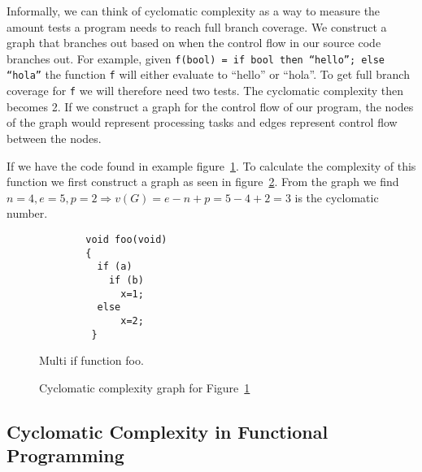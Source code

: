 Informally, we can think of cyclomatic complexity as a way to measure the amount
tests a program needs to reach full branch coverage. We construct a graph that
branches out based on when the control flow in our source code branches out. For
example, given \texttt{f(bool) = if bool then ``hello''; else ``hola''} the
function \texttt{f} will either evaluate to ``hello'' or ``hola''. To get full
branch coverage for \texttt{f} we will therefore need two tests. The cyclomatic
complexity then becomes 2. If we construct a graph for the control flow of our
program, the nodes of the graph would represent processing tasks and edges
represent control flow between the nodes. 

If we have the code found in example figure~\ref{c1excode}. To calculate the
complexity of this function we first construct a graph as seen in
figure~\ref{fig:c1exgraph}. From the graph we find $n=4, e=5, p=2\Rightarrow
v(G)=e-n+p=5-4+2=3$ is the cyclomatic number.

\begin{figure}[H]
    \begin{lstlisting}
        void foo(void)
        {
          if (a)
            if (b) 
              x=1;
          else
              x=2;
         }
    \end{lstlisting}
    \caption{Multi if function foo.}
    \label{c1excode}
\end{figure}


\begin{figure}[H]
    \centering
    \caption{Cyclomatic complexity graph for Figure~\ref{c1excode}}
    \label{fig:c1exgraph}
\end{figure}

\subsection{Cyclomatic Complexity in Functional
Programming}

